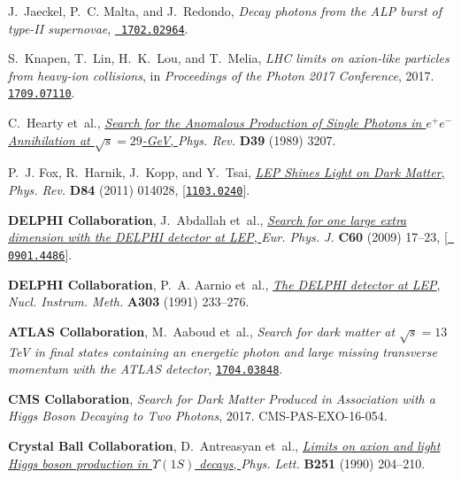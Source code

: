 \documentclass[11pt,a4paper]{article}
\begin{document}
\begin{thebibliography}{10}
J.~Jaeckel, P.~C. Malta, and J.~Redondo, {\it {Decay photons from the ALP burst
  of type-II supernovae}},  \href{http://arxiv.org/abs/1702.02964}{{\tt
  1702.02964}}.
  
S.~Knapen, T.~Lin, H.~K.~Lou, and T.~Melia,
  {{\it {LHC limits on axion-like particles from heavy-ion collisions}},} in {\em {Proceedings of the Photon 2017 Conference}}, 2017. \newblock \href{http://arxiv.org/abs/1709.07110}{{\tt 1709.07110}}.
  
C.~Hearty et~al., \href{http://dx.doi.org/10.1103/PhysRevD.39.3207}{{\it
  {Search for the Anomalous Production of Single Photons in $e^+ e^-$
  Annihilation at $\sqrt{s}=29$-{GeV}}}, } {\em Phys. Rev.} {\bf D39} (1989)
  3207.

P.~J. Fox, R.~Harnik, J.~Kopp, and Y.~Tsai,
  \href{http://dx.doi.org/10.1103/PhysRevD.84.014028}{{\it {LEP Shines Light on
  Dark Matter}}, } {\em Phys. Rev.} {\bf D84} (2011) 014028,
  [\href{http://arxiv.org/abs/1103.0240}{{\tt 1103.0240}}].

{\bf DELPHI Collaboration}, J.~Abdallah et~al.,
  \href{http://dx.doi.org/10.1140/epjc/s10052-009-0874-9}{{\it {Search for one
  large extra dimension with the DELPHI detector at LEP}}, } {\em Eur. Phys.
  J.} {\bf C60} (2009) 17--23, [\href{http://arxiv.org/abs/0901.4486}{{\tt
  0901.4486}}].

{\bf DELPHI Collaboration}, P.~A. Aarnio et~al.,
  \href{http://dx.doi.org/10.1016/0168-9002(91)90793-P}{{\it {The DELPHI
  detector at LEP}}, } {\em Nucl. Instrum. Meth.} {\bf A303} (1991) 233--276.

{\bf ATLAS Collaboration}, M.~Aaboud et~al., {\it {Search for dark matter at
  $\sqrt{s}=13$ TeV in final states containing an energetic photon and large
  missing transverse momentum with the ATLAS detector}},
  \href{http://arxiv.org/abs/1704.03848}{{\tt 1704.03848}}.

{\bf CMS Collaboration}, {\it {Search for Dark Matter Produced in Association
  with a Higgs Boson Decaying to Two Photons}},  2017.
\newblock CMS-PAS-EXO-16-054.

{\bf Crystal Ball Collaboration}, D.~Antreasyan et~al.,
  \href{http://dx.doi.org/10.1016/0370-2693(90)90254-4}{{\it {Limits on axion
  and light Higgs boson production in $\Upsilon(1S)$ decays}}, } {\em Phys.
  Lett.} {\bf B251} (1990) 204--210.


\end{thebibliography}
\end{document}
